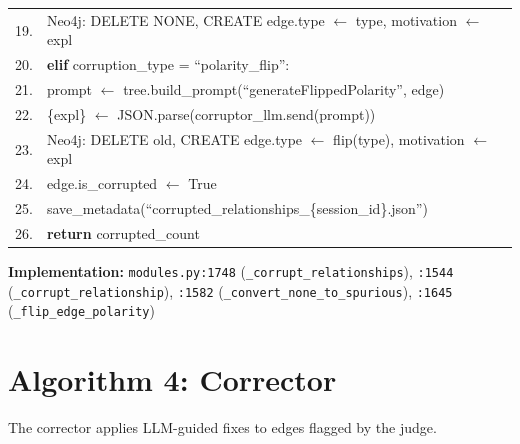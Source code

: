 \begin{table}[H]
\begin{tabular}{@{}r l@{}}
19. & \quad\quad Neo4j: DELETE NONE, CREATE edge.type $\leftarrow$ type, motivation $\leftarrow$ expl \\
20. & \quad \textbf{elif} corruption\_type = ``polarity\_flip'': \\
21. & \quad\quad prompt $\leftarrow$ tree.build\_prompt(``generateFlippedPolarity'', edge) \\
22. & \quad\quad \{expl\} $\leftarrow$ JSON.parse(corruptor\_llm.send(prompt)) \\
23. & \quad\quad Neo4j: DELETE old, CREATE edge.type $\leftarrow$ flip(type), motivation $\leftarrow$ expl \\
24. & \quad edge.is\_corrupted $\leftarrow$ True \\
25. & save\_metadata(``corrupted\_relationships\_\{session\_id\}.json'') \\
26. & \textbf{return} corrupted\_count \\
\bottomrule
\end{tabular}
\end{table}

\textbf{Implementation:} \texttt{modules.py:1748} (\texttt{\_corrupt\_relationships}), \texttt{:1544} (\texttt{\_corrupt\_relationship}), \texttt{:1582} (\texttt{\_convert\_none\_to\_spurious}), \texttt{:1645} (\texttt{\_flip\_edge\_polarity})

\section{Algorithm 4: Corrector}
\label{alg:corrector}

The corrector applies LLM-guided fixes to edges flagged by the judge.

